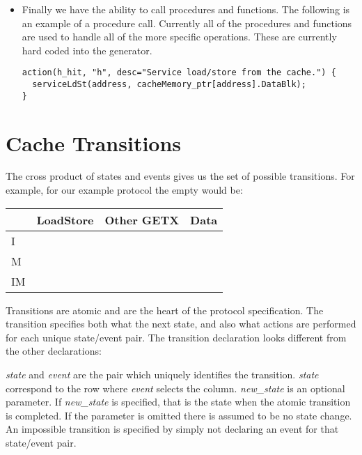 \documentclass[11pt]{article}
\begin{document}
\begin{itemize}
\item 
Finally we have the ability to call procedures and functions.  The
following is an example of a procedure call.  Currently all of the
procedures and functions are used to handle all of the more specific
operations.  These are currently hard coded into the generator.

\begin{verbatim}
action(h_hit, "h", desc="Service load/store from the cache.") {
  serviceLdSt(address, cacheMemory_ptr[address].DataBlk);
}
\end{verbatim}

\end{itemize}

\section*{Cache Transitions}

The cross product of states and events gives us the set of possible
transitions.  For example, for our example protocol the empty would
be:

\begin{center}
\begin{tabular}{|l||l|l|l|} \hline
   & LoadStore & Other GETX & Data \\ \hline  \hline
I  & & &  \\ \hline
M  & & &  \\ \hline
IM & & & \\ \hline
\end{tabular}
\end{center}


Transitions are atomic and are the heart of the protocol
specification.  The transition specifies both what the next state, and
also what actions are performed for each unique state/event pair.  The
transition declaration looks different from the other declarations:


{\em state} and {\em event} are the pair which uniquely identifies the
transition. {\em state} correspond to the row where {\em event}
selects the column.  {\em new\_state} is an optional parameter.  If
{\em new\_state} is specified, that is the state when the atomic
transition is completed.  If the parameter is omitted there is assumed
to be no state change.  An impossible transition is specified by
simply not declaring an event for that state/event pair.
\end{document}
